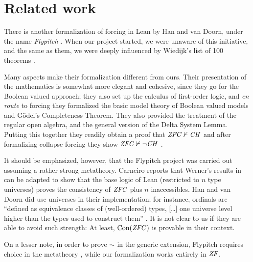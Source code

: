 \section{Related work}
\label{sec:related-work}

There is another formalization of forcing in Lean by Han and van
Doorn, under the name \emph{Flypitch} \cite{han_et_al:LIPIcs:2019:11074,DBLP:conf/cpp/HanD20}. When our project started, we
were unaware of this initiative, and the same as them, we were deeply
influenced by Wiedijk's list of 100 theorems \cite{Formalizing100}.

Many aspects make their formalization different from ours. Their
presentation of the mathematics is somewhat more elegant and cohesive,
since they go for the Boolean valued approach; they also  set up the
calculus of first-order logic, and \emph{en route} to forcing they
formalized the basic model theory of Boolean valued models and Gödel's
Completeness Theorem. They also provided the treatment of the regular
open algebra, and the general version of the Delta System
Lemma. Putting this together they readily obtain a proof that
$\mathit{ZFC}\nvdash \mathit{CH}$ \cite{han_et_al:LIPIcs:2019:11074} and after
formalizing collapse forcing they show  $\mathit{ZFC}\nvdash \neg\mathit{CH}$
\cite[Sect.~5.6]{DBLP:conf/cpp/HanD20}.

It should be emphasized, however, that the Flypitch project was
carried out assuming a rather strong metatheory.
Carneiro \cite{carneiro-ms-thesis} reports that Werner's results in
\cite{10.5555/645869.668660} can be adapted to show that the base
logic  of Lean (restricted to $n$
type universes) proves the consistency of $\mathit{ZFC}$ plus $n$
inaccessibles. Han and van Doorn did use universes in their
implementation; for instance, ordinals are “defined as equivalence
classes of (well-ordered) types, [\dots] one
universe level higher than the types used to construct them”
\cite{han_et_al:LIPIcs:2019:11074}. It is not clear to us if they are
able to avoid such strength: At least, $\operatorname{Con}(\mathit{ZFC})$ is provable in
their context. %

On a lesser note, in order to prove $\AC$ in the generic extension,
Flypitch requires choice in the metatheory
\cite[p.~11]{han_et_al:LIPIcs:2019:11074}, while our formalization works
entirely in $\mathit{ZF}$. %

